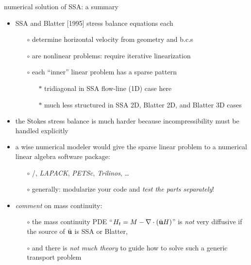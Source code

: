 \begin{frame}{numerical solution of SSA: a summary}

\begin{itemize}
\item SSA and Blatter [1995] stress balance equations each
   \begin{itemize}
   \item[$\circ$]  determine horizontal velocity from geometry and b.c.s
   \item[$\circ$]  are nonlinear problems: require iterative linearization
   \item[$\circ$]  each ``inner'' linear problem has a sparse pattern
      \begin{itemize}
      \item[$\ast$] tridiagonal in SSA flow-line (1D) case here
      \item[$\ast$] much less structured in SSA 2D, Blatter 2D, and Blatter 3D cases
      \end{itemize}
   \end{itemize}
\item the Stokes stress balance is much harder because incompressibility must be handled explicitly
\item a wise numerical modeler would give the sparse linear problem to a numerical linear algebra software package:
  \begin{itemize}
  \item[$\circ$]  \Matlab/\Octave, \emph{LAPACK}, \emph{PETSc}, \emph{Trilinos}, \dots
  \item[$\circ$]  generally: modularize your code and \emph{test the parts separately}!
  \end{itemize}
\item \emph{comment} on mass continuity:  
  \begin{itemize}
  \item[$\circ$]  the mass continuity PDE ``$H_t = M - \nabla\cdot\left(\bar {\mathbf{u}} H\right)$'' is \emph{not} very diffusive if the source of $\bar {\mathbf{u}}$ is SSA or Blatter,
  \item[$\circ$]  and there is \emph{not much theory} to guide how to solve such a generic transport problem
  \end{itemize}
\end{itemize}
\end{frame}


